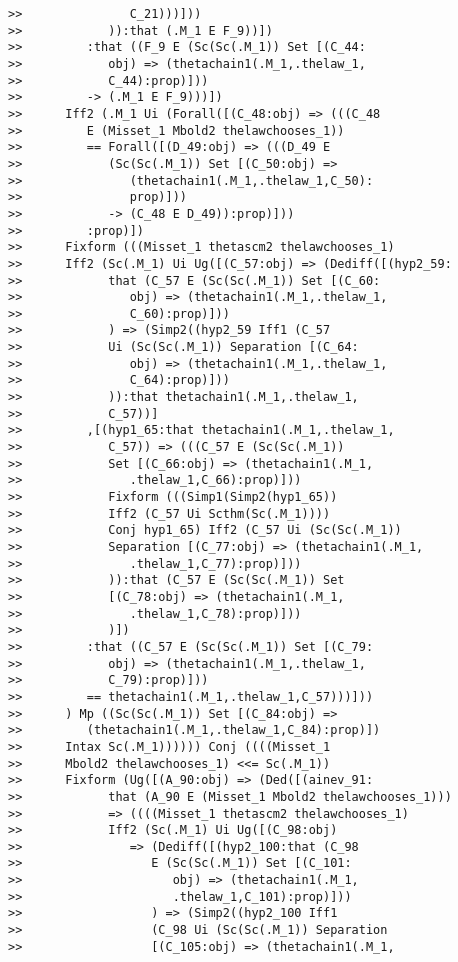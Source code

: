 \documentclass[12pt]{article}
\begin{document}
\begin{verbatim}
>>               C_21)))]))
>>            )):that (.M_1 E F_9))])
>>         :that ((F_9 E (Sc(Sc(.M_1)) Set [(C_44:
>>            obj) => (thetachain1(.M_1,.thelaw_1,
>>            C_44):prop)]))
>>         -> (.M_1 E F_9)))])
>>      Iff2 (.M_1 Ui (Forall([(C_48:obj) => (((C_48
>>         E (Misset_1 Mbold2 thelawchooses_1))
>>         == Forall([(D_49:obj) => (((D_49 E
>>            (Sc(Sc(.M_1)) Set [(C_50:obj) =>
>>               (thetachain1(.M_1,.thelaw_1,C_50):
>>               prop)]))
>>            -> (C_48 E D_49)):prop)]))
>>         :prop)])
>>      Fixform (((Misset_1 thetascm2 thelawchooses_1)
>>      Iff2 (Sc(.M_1) Ui Ug([(C_57:obj) => (Dediff([(hyp2_59:
>>            that (C_57 E (Sc(Sc(.M_1)) Set [(C_60:
>>               obj) => (thetachain1(.M_1,.thelaw_1,
>>               C_60):prop)]))
>>            ) => (Simp2((hyp2_59 Iff1 (C_57
>>            Ui (Sc(Sc(.M_1)) Separation [(C_64:
>>               obj) => (thetachain1(.M_1,.thelaw_1,
>>               C_64):prop)]))
>>            )):that thetachain1(.M_1,.thelaw_1,
>>            C_57))]
>>         ,[(hyp1_65:that thetachain1(.M_1,.thelaw_1,
>>            C_57)) => (((C_57 E (Sc(Sc(.M_1))
>>            Set [(C_66:obj) => (thetachain1(.M_1,
>>               .thelaw_1,C_66):prop)]))
>>            Fixform (((Simp1(Simp2(hyp1_65))
>>            Iff2 (C_57 Ui Scthm(Sc(.M_1))))
>>            Conj hyp1_65) Iff2 (C_57 Ui (Sc(Sc(.M_1))
>>            Separation [(C_77:obj) => (thetachain1(.M_1,
>>               .thelaw_1,C_77):prop)]))
>>            )):that (C_57 E (Sc(Sc(.M_1)) Set
>>            [(C_78:obj) => (thetachain1(.M_1,
>>               .thelaw_1,C_78):prop)]))
>>            )])
>>         :that ((C_57 E (Sc(Sc(.M_1)) Set [(C_79:
>>            obj) => (thetachain1(.M_1,.thelaw_1,
>>            C_79):prop)]))
>>         == thetachain1(.M_1,.thelaw_1,C_57)))]))
>>      ) Mp ((Sc(Sc(.M_1)) Set [(C_84:obj) =>
>>         (thetachain1(.M_1,.thelaw_1,C_84):prop)])
>>      Intax Sc(.M_1)))))) Conj ((((Misset_1
>>      Mbold2 thelawchooses_1) <<= Sc(.M_1))
>>      Fixform (Ug([(A_90:obj) => (Ded([(ainev_91:
>>            that (A_90 E (Misset_1 Mbold2 thelawchooses_1)))
>>            => ((((Misset_1 thetascm2 thelawchooses_1)
>>            Iff2 (Sc(.M_1) Ui Ug([(C_98:obj)
>>               => (Dediff([(hyp2_100:that (C_98
>>                  E (Sc(Sc(.M_1)) Set [(C_101:
>>                     obj) => (thetachain1(.M_1,
>>                     .thelaw_1,C_101):prop)]))
>>                  ) => (Simp2((hyp2_100 Iff1
>>                  (C_98 Ui (Sc(Sc(.M_1)) Separation
>>                  [(C_105:obj) => (thetachain1(.M_1,

\end{verbatim}
\end{document}
